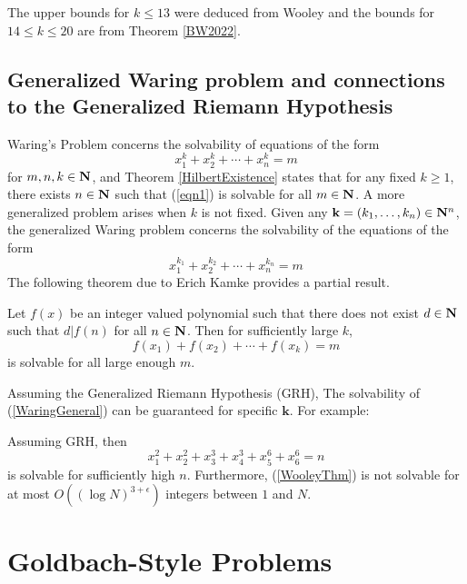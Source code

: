 The upper bounds for $k\le13$ were deduced from Wooley \cite{Wooley_2016} and the bounds for $14\le k\le 20$ are from Theorem \ref{BW2022}.

\subsection{Generalized Waring problem and connections to the Generalized Riemann Hypothesis}

Waring's Problem concerns the solvability of equations of the form
\begin{equation}
    x_1^k+x_2^k+\cdots+x_n^k=m \label{eqn1}
\end{equation}
for $m,n,k\in\mathbf{N}$, and Theorem \ref{HilbertExistence} states that for any fixed $k\ge1$, there exists $n\in \mathbf{N}$ such that (\ref{eqn1}) is solvable for all $m\in\mathbf{N}$. A more generalized problem arises when $k$ is not fixed. Given any $\mathbf k=(k_1,\dots,k_n)\in\mathbf{N}^n$, the generalized Waring problem concerns the solvability of the equations of the form
\begin{equation}
    x_1^{k_1}+x_2^{k_2}+\cdots+x_n^{k_n}=m\label{WaringGeneral}
\end{equation}
The following theorem due to Erich Kamke provides a partial result.

\begin{theorem}[Kamke]
    Let $f(x)$ be an integer valued polynomial such that there does not exist $d\in\mathbf{N}$ such that $d|f(n)$ for all $n\in\mathbf{N}$. Then for sufficiently large $k$,
    $$f(x_1)+f(x_2)+\cdots+f(x_k)=m$$
    is solvable for all large enough $m$.
\end{theorem}

Assuming the Generalized Riemann Hypothesis (GRH), The solvability of (\ref{WaringGeneral}) can be guaranteed for specific $\mathbf k$. For example:

\begin{theorem}[Wooley]
    Assuming GRH, then
    \begin{equation}
        x_1^2+x_2^2+x_3^3+x_4^3+x_5^6+x_6^6=n \label{WooleyThm}
    \end{equation}
    is solvable for sufficiently high $n$. Furthermore, (\ref{WooleyThm}) is not solvable for at most $O((\log N)^{3+\epsilon})$ integers between $1$ and $N$.
\end{theorem}

\section{Goldbach-Style Problems}

